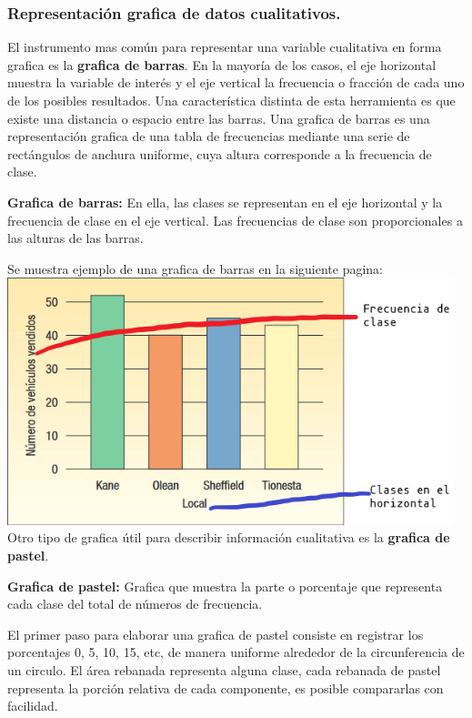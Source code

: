 \documentclass[]{article}
\begin{document}
\subsubsection*{Representación grafica de datos cualitativos.}
El instrumento mas común para representar una variable cualitativa en forma grafica es la \textbf{grafica de barras}. En la mayoría de los casos, el eje horizontal muestra la variable de interés y el eje vertical la frecuencia o fracción de cada uno de los posibles resultados. Una característica distinta de esta herramienta es que existe una distancia o espacio entre las barras. Una grafica de barras es una representación grafica de una tabla de frecuencias mediante una serie de rectángulos de anchura uniforme, cuya altura corresponde a la frecuencia de clase.
\begin{center}
\textbf{Grafica de barras:} En ella, las clases se representan en el eje horizontal y la frecuencia de clase en el eje vertical. Las frecuencias de clase son proporcionales a las alturas de las barras.
\end{center}
Se muestra ejemplo de una grafica de barras en la siguiente pagina:\\
\includegraphics[width=13cm]{imagenes/graficaBarras2_1.png} \\
Otro tipo de grafica útil para describir información cualitativa es la \textbf{grafica de pastel}.
\begin{center}
	\textbf{Grafica de pastel: }Grafica que muestra la parte o porcentaje que representa cada clase del total de números de frecuencia.
\end{center}
El primer paso para elaborar una grafica de pastel consiste en registrar los porcentajes 0, 5, 10, 15, etc, de manera uniforme alrededor de la circunferencia de un circulo. El área rebanada representa alguna clase, cada rebanada de pastel representa la  porción relativa de cada componente, es posible compararlas con facilidad.\\
\end{document}
